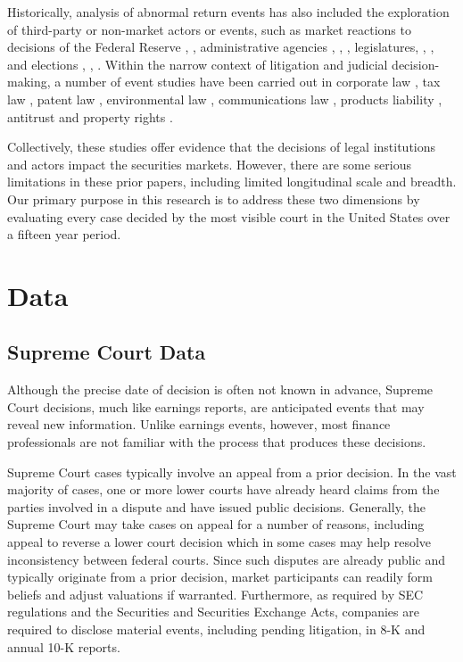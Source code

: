 \documentclass[preprint,12pt]{elsarticle}
\begin{document}
Historically, analysis of abnormal return events has also included the exploration of third-party or non-market actors or events, such as market reactions to decisions of the Federal Reserve \cite{bomfim2003pre}, \cite{bernanke2005explains}, administrative agencies \cite{bosch1994wealth}, \cite{sarkar2006market}, \cite{lax2006courts}, \cite{ellert1976mergers} legislatures, \cite{gilligan1988complex}, \cite{cutler1988tax}, and elections \cite{roberts1990political}, \cite{herron1999measurement}, \cite{knight2006policy}.  Within the narrow context of litigation and judicial decision-making, a number of event studies have been carried out in corporate law \cite{bhagat1998shareholder} \cite{ryngaert1988effect}, tax law \cite{key2011shareholder} \cite{dhaliwal1998wealth}, patent law \cite{marco2013certain}, environmental law \cite{sun2011effects}, communications law \cite{chen2013does},  products liability \cite{prince2002effects} \cite{viscusi1990market}, antitrust \cite{huth1989impact} \cite{bizjak1995effect} and property rights \cite{keay2011property}.  

Collectively, these studies offer evidence that the decisions of legal institutions and actors impact the securities markets.  However, there are some serious limitations in these prior papers, including limited longitudinal scale and breadth.  Our primary purpose in this research is to address these two dimensions by evaluating every case decided by the most visible court in the United States over a fifteen year period.

\section{Data}
\label{S:3}
\subsection{Supreme Court Data}
Although the precise date of decision is often not known in advance, Supreme Court decisions, much like earnings reports, are anticipated events that may reveal new information.  Unlike earnings events, however, most finance professionals are not familiar with the process that produces these decisions.

Supreme Court cases typically involve an appeal from a prior decision.  In the vast majority of cases, one or more lower courts have already heard claims from the parties involved in a dispute and have issued public decisions.  Generally, the Supreme Court may take cases on appeal for a number of reasons, including appeal to reverse a lower court decision which in some cases may help resolve inconsistency between federal courts.  Since such disputes are already public and typically originate from a prior decision, market participants can readily form beliefs and adjust valuations if warranted.  Furthermore, as required by SEC regulations and the Securities and Securities Exchange Acts, companies are required to disclose material events, including pending litigation, in 8-K and annual 10-K reports.
\end{document}
